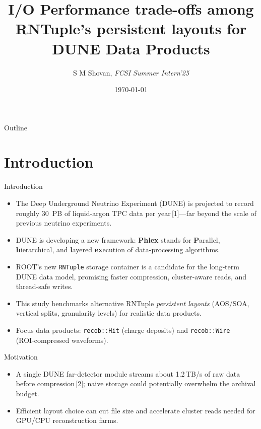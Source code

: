 \documentclass[aspectratio=169]{beamer}
\title{I/O Performance trade-offs among RNTuple’s persistent layouts for DUNE Data Products}
\subtitle{}
\author{S M Shovan, \textit{FCSI Summer Intern'25}}
\institute{Fermi National Accelerator Laboratory}
\date{\today}
\begin{document}
\maketitle


\begin{frame}{Outline}
\tableofcontents
\end{frame}

\section{Introduction}

\begin{frame}{Introduction}
  \begin{itemize}
    \item The Deep Underground Neutrino Experiment (DUNE) is projected to record roughly 30~PB of liquid‑argon TPC data per year\,[1]—far beyond the scale of previous neutrino experiments.
    \item DUNE is developing a new framework: \textbf{Phlex} stands for \textbf{P}arallel, \textbf{h}ierarchical, and \textbf{l}ayered \textbf{ex}ecution of data-processing algorithms.
    \item ROOT’s new \texttt{RNTuple} storage container is a candidate for the long‑term DUNE data model, promising faster compression, cluster‑aware reads, and thread‑safe writes.
    \item This study benchmarks alternative RNTuple \emph{persistent layouts} (AOS/SOA, vertical splits, granularity levels) for realistic data products.
    \item Focus data products: \texttt{recob::Hit} (charge deposits) and \texttt{recob::Wire} (ROI‑compressed waveforms).
  \end{itemize}
\end{frame}

\begin{frame}{Motivation} 
  \begin{itemize}
    \item A single DUNE far‑detector module streams about 1.2\,TB/s of raw data before compression\,[2]; naive storage could potentially overwhelm the archival budget.

    \vspace{2em}

    \item Efficient layout choice can cut file size and accelerate cluster reads needed for GPU/CPU reconstruction farms.
  \end{itemize}
\end{frame}
\end{document}

